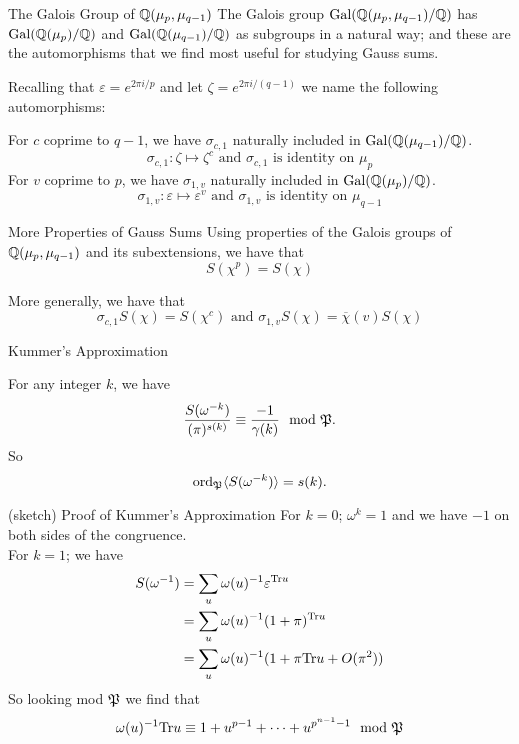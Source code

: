 \documentclass[presentation]{beamer}
\begin{document}
\begin{frame}{The Galois Group of $\mathbb{Q}(\mu_p, \mu_{q-1})$}
The Galois group $\textrm{Gal}(\mathbb{Q}(\mu_p, \mu_{q-1})/\mathbb{Q})$ has $\textrm{Gal}(\mathbb{Q}(\mu_p)/\mathbb{Q})$ and $\textrm{Gal}(\mathbb{Q}(\mu_{q-1})/\mathbb{Q})$ as subgroups in a natural way; and these are the automorphisms that we find most useful for studying Gauss sums. 

Recalling that $\varepsilon = e^{2 \pi i /p}$ and let $\zeta = e^{2 \pi i/ (q-1)}$ we name the following automorphisms:\\
\pause
\vspace{0.5cm}

For $c$ coprime to $q-1$, we have $\sigma_{c,1}$ naturally included in $\textrm{Gal}(\mathbb{Q}(\mu_{q-1})/\mathbb{Q})$.
\[\sigma_{c,1} : \zeta \mapsto \zeta^c \text{ and } \sigma_{c,1} \text{ is identity on } \mu_p\]
\pause
\vspace{0.5cm}
For $v$ coprime to $p$, we have $\sigma_{1,v}$ naturally included in $\textrm{Gal}(\mathbb{Q}(\mu_{p})/\mathbb{Q})$.
\[\sigma_{1,v} : \varepsilon \mapsto \varepsilon^v \text{ and } \sigma_{1,v} \text{ is identity on } \mu_{q-1}\]
\end{frame}

\begin{frame}{More Properties of Gauss Sums }
Using properties of the Galois groups of $\mathbb{Q}(\mu_p, \mu_{q-1})$ and its subextensions, we have that \[S(\chi^p) = S(\chi)\] 
\pause
\vspace{0.5cm}

More generally, we have that \[\sigma_{c,1}S(\chi) = S(\chi^c) \text{ and } \sigma_{1,v} S(\chi) = \overline{\chi}(v)S(\chi)\]
\end{frame}

\begin{frame}{Kummer's Approximation}
\begin{theorem}
For any integer $k$, we have \[\frac{S(\omega^{-k})}{(\pi)^{s(k)}} \equiv \frac{-1}{\gamma(k)} \mod {\mathfrak{P}}.\]
So \[\textrm{ord}_{\mathfrak{P}} \langle S(\omega^{-k} ) \rangle= s(k).\]
\end{theorem}
\end{frame}

\begin{frame}{(sketch) Proof of Kummer's Approximation}
For $k =0$; $\omega^k = 1$ and we have $-1$ on both sides of the congruence.\\
\pause
\vspace{0.5cm}
For $k=1$; we have \begin{align*}
S(\omega^{-1}) &= \sum_u \omega(u)^{-1} \varepsilon^{\textrm{Tr} u} \\
&= \sum_u \omega(u)^{-1} (1 + \pi)^{\textrm{Tr} u} \\
&= \sum_u \omega(u)^{-1} ( 1 + \pi \textrm{Tr} u + O(\pi^2))
\end{align*}
\pause
\vspace{0.5cm}
So looking mod $\mathfrak{P}$ we find that \[\omega(u)^{-1} \textrm{Tr} u \equiv 1 + u^{p-1} + \cdots + u^{p^{n-1} -1} \mod {\mathfrak{P}}\]
\end{frame}
\end{document}
